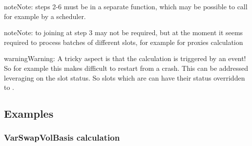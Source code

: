\documentclass[letterpaper,10pt,english]{sphinxmanual}
\begin{document}
\begin{sphinxadmonition}{note}{Note:}
steps 2-6 must be in a separate function, which may be possible to
call for example by a scheduler.
\end{sphinxadmonition}

\begin{sphinxadmonition}{note}{Note:}
to joining at step 3 may not be required, but at the moment it
seems required to process batches of different slots, for example
for proxies calculation
\end{sphinxadmonition}

\begin{sphinxadmonition}{warning}{Warning:}
A tricky aspect is that the calculation is triggered by an event!
So for example this makes difficult to restart from a crash.
This can be addressed leveraging on the slot  status. So
slots which are  can have their status overridden to
.
\end{sphinxadmonition}


\subsection{Examples}
\label{\detokenize{slot_prod:examples}}

\subsubsection{VarSwapVolBasis calculation}
\label{\detokenize{slot_prod:varswapvolbasis-calculation}}
%
\begin{sphinxVerbatim}[commandchars=\\\{\}]
  
  
  
\end{sphinxVerbatim}
\end{document}
